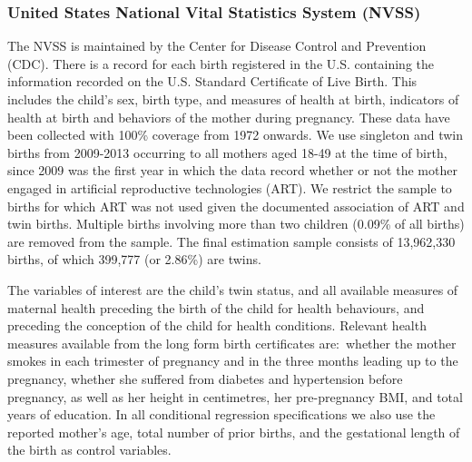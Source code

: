 \documentclass{nature}
\begin{document}
\begin{linenumbers}
\subsubsection{United States National Vital Statistics System (NVSS)}
The NVSS is maintained by the Center for Disease Control and Prevention (CDC). %
 There is a record for each birth registered in the U.S. containing the information recorded on the U.S. Standard Certificate of Live Birth. This includes the child's sex, birth type, and measures of health at birth,  indicators of health at birth and behaviors of the mother during pregnancy. These data have been collected with 100\% coverage from 1972 onwards. We use singleton and twin births from 2009-2013\cite{Martinetal2013} occurring to all mothers aged 18-49 at the time of birth, since 2009 was the first year in which the data record whether or not the mother engaged in artificial reproductive technologies (ART).%
We restrict the sample to births for which ART was not used given the documented association of ART and twin births. Multiple births involving more than two children (0.09\% of all births) are removed from the sample. The final estimation sample consists of 13,962,330 births, of which 399,777 (or 2.86\%) are twins.
  

The variables of interest are the child's twin status, and all available measures of maternal health preceding the birth of the child for health behaviours, and preceding the conception of the child for health conditions.  %
 Relevant health measures available from the long form birth certificates are:\ whether the mother smokes in each trimester of pregnancy and in the three months leading up to the pregnancy, whether she suffered from diabetes and hypertension before pregnancy, as well as her height in centimetres, her pre-pregnancy BMI, and total years of education. 
  In all conditional regression specifications we also use the reported mother's age, total number of prior births, and the gestational length of the birth as control variables\cite{Hall2003}.  %
  



\end{linenumbers}
\end{document}
